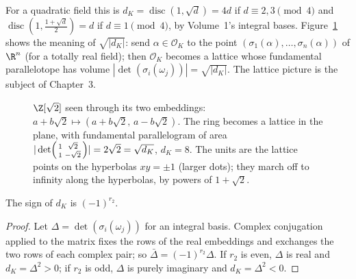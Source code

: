 For a quadratic field this is $d_K=\operatorname{disc}(1,\sqrt d)=4d$ if $d\equiv2,3\pmod4$ and
$\operatorname{disc}(1,\frac{1+\sqrt d}2)=d$ if $d\equiv1\pmod4$, by Volume~1's integral bases. Figure~\ref{fig:mink}
shows the meaning of $\sqrt{|d_K|}$: send $\alpha\in\mathcal O_K$ to the point $(\sigma_1(\alpha),\dots,\sigma_n(\alpha))$
of $\R^n$ (for a totally real field); then $\mathcal O_K$ becomes a lattice whose fundamental parallelotope has volume
$|\det(\sigma_i(\omega_j))|=\sqrt{|d_K|}$. The lattice picture is the subject of Chapter~3.

\begin{figure}[ht]
\centering
{}
\caption{$\Z[\sqrt2]$ seen through its two embeddings: $a+b\sqrt2\mapsto(a+b\sqrt2,\,a-b\sqrt2)$. The ring becomes a
lattice in the plane, with fundamental parallelogram of area $|\det\begin{psmallmatrix}1&\sqrt2\\1&-\sqrt2\end{psmallmatrix}|=
2\sqrt2=\sqrt{d_K}$, $d_K=8$. The units are the lattice points on the hyperbolas $xy=\pm1$ (larger dots); they march
off to infinity along the hyperbolas, by powers of $1+\sqrt2$.}
\label{fig:mink}
\end{figure}

\begin{proposition}\label{prop:sign}
The sign of $d_K$ is $(-1)^{r_2}$.
\end{proposition}
\begin{proof}
Let $\Delta=\det(\sigma_i(\omega_j))$ for an integral basis. Complex conjugation applied to the matrix fixes the rows of
the real embeddings and exchanges the two rows of each complex pair; so $\bar\Delta=(-1)^{r_2}\Delta$. If $r_2$ is even,
$\Delta$ is real and $d_K=\Delta^2>0$; if $r_2$ is odd, $\Delta$ is purely imaginary and $d_K=\Delta^2<0$.
\end{proof}


